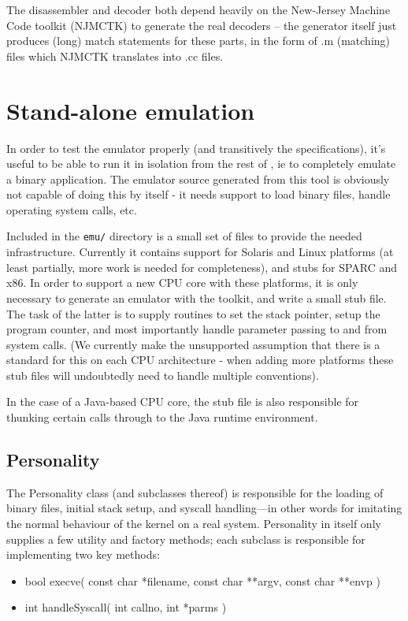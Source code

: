The disassembler and decoder both depend heavily on the New-Jersey 
Machine Code toolkit (NJMCTK) to generate the real decoders -- the 
generator itself just produces (long) match statements for these parts, 
in the form of .m (matching) files which NJMCTK translates into .cc files.


\section{Stand-alone emulation}

In order to test the emulator properly (and transitively the
specifications), it's useful to be able to run it in isolation from the
rest of \walk, ie to completely emulate a binary application. The emulator
source generated from this tool is obviously not capable of doing this by
itself - it needs support to load binary files, handle operating system
calls, etc.

Included in the \texttt{emu/} directory is a small set of files to provide the
needed infrastructure. Currently it contains support for Solaris and Linux
platforms (at least partially, more work is needed for completeness), and
stubs for SPARC and x86. In order to support a new CPU core with these
platforms, it is only necessary to generate an emulator with the toolkit,
and write a small stub file. The task of the latter is to supply routines
to set the stack pointer, setup the program counter, and most importantly
handle parameter passing to and from system calls. (We currently make the
unsupported assumption that there is a standard for this on each CPU
architecture - when adding more platforms these stub files will
undoubtedly need to handle multiple conventions).

In the case of a Java-based CPU core, the stub file is also responsible for
thunking certain calls through to the Java runtime environment.


\subsection{Personality}

The Personality class (and subclasses thereof) is responsible for the
loading of binary files, initial stack setup, and syscall handling---in
other words for imitating the normal behaviour of the kernel on a real
system. Personality in itself only supplies a few utility and factory
methods; each subclass is responsible for implementing two key methods:

\begin{itemize}
   \item bool execve( const char *filename, const char **argv, 
		const char **envp )
   \item int handleSyscall( int callno, int *parms )
\end{itemize}

